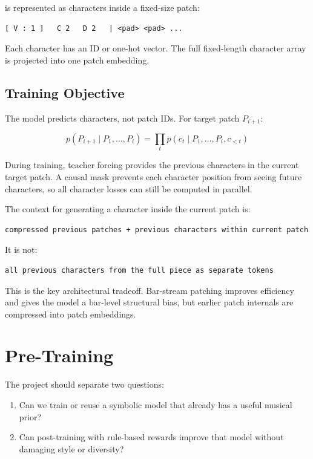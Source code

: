\documentclass[11pt]{article}
\begin{document}
is represented as characters inside a fixed-size patch:

\begin{verbatim}
[ V : 1 ]   C 2   D 2   | <pad> <pad> ...
\end{verbatim}

Each character has an ID or one-hot vector. The full fixed-length character
array is projected into one patch embedding.

\subsection{Training Objective}

The model predicts characters, not patch IDs. For target patch \(P_{i+1}\):

\[
p(P_{i+1} \mid P_1, \ldots, P_i)
= \prod_t p(c_t \mid P_1, \ldots, P_i, c_{<t})
\]

During training, teacher forcing provides the previous characters in the current
target patch. A causal mask prevents each character position from seeing future
characters, so all character losses can still be computed in parallel.

The context for generating a character inside the current patch is:

\begin{verbatim}
compressed previous patches + previous characters within current patch
\end{verbatim}

It is not:

\begin{verbatim}
all previous characters from the full piece as separate tokens
\end{verbatim}

This is the key architectural tradeoff. Bar-stream patching improves efficiency
and gives the model a bar-level structural bias, but earlier patch internals are
compressed into patch embeddings.

\section{Pre-Training}
\label{sec:pretraining}

The project should separate two questions:

\begin{enumerate}[leftmargin=*]
  \item Can we train or reuse a symbolic model that already has a useful musical
  prior?
  \item Can post-training with rule-based rewards improve that model without
  damaging style or diversity?
\end{enumerate}
\end{document}
